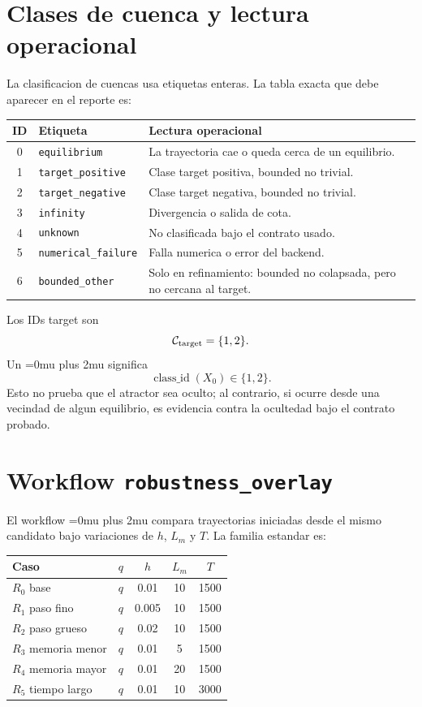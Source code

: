 \documentclass[11pt]{article}
\DeclareRobustCommand{\codepath}[1]{\begingroup\Urlmuskip=0mu plus 2mu\path{#1}\endgroup}
\begin{document}
\section{Clases de cuenca y lectura operacional}

La clasificacion de cuencas usa etiquetas enteras. La tabla exacta que debe
aparecer en el reporte es:

\begin{center}
\begin{tabularx}{\textwidth}{@{}cL{0.24\textwidth}Y@{}}
\toprule
ID & Etiqueta & Lectura operacional \\
 & \texttt{equilibrium} & La trayectoria cae o queda cerca de un equilibrio.\\
1 & \texttt{target\_positive} & Clase target positiva, bounded no trivial.\\
2 & \texttt{target\_negative} & Clase target negativa, bounded no trivial.\\
3 & \texttt{infinity} & Divergencia o salida de cota.\\
4 & \texttt{unknown} & No clasificada bajo el contrato usado.\\
5 & \texttt{numerical\_failure} & Falla numerica o error del backend.\\
6 & \texttt{bounded\_other} & Solo en refinamiento: bounded no colapsada, pero no cercana al target.\\
\bottomrule
\end{tabularx}
\end{center}

Los IDs target son
\[
\mathcal C_{\rm target}=\{1,2\}.
\]
Un \codepath{target_hit} significa
\[
\operatorname{class\_id}(X_0)\in\{1,2\}.
\]
Esto no prueba que el atractor sea oculto; al contrario, si ocurre desde una
vecindad de algun equilibrio, es evidencia contra la ocultedad bajo el contrato
probado.

\section{Workflow \texttt{robustness\_overlay}}

El workflow \codepath{robustness_overlay} compara trayectorias iniciadas desde
el mismo candidato bajo variaciones de \(h\), \(L_m\) y \(T\). La familia
estandar es:

\begin{center}
\begin{tabular}{lcccc}
\toprule
Caso & \(q\) & \(h\) & \(L_m\) & \(T\) \\
\midrule
\(R_0\) base & \(q\) & 0.01 & 10 & 1500\\
\(R_1\) paso fino & \(q\) & 0.005 & 10 & 1500\\
\(R_2\) paso grueso & \(q\) & 0.02 & 10 & 1500\\
\(R_3\) memoria menor & \(q\) & 0.01 & 5 & 1500\\
\(R_4\) memoria mayor & \(q\) & 0.01 & 20 & 1500\\
\(R_5\) tiempo largo & \(q\) & 0.01 & 10 & 3000\\
\bottomrule
\end{tabular}
\end{center}
\end{document}
